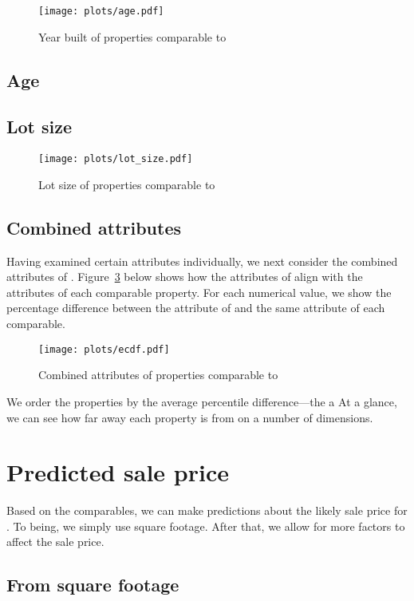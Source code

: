 \documentclass[
12pt, %
letterpaper, %
oneside, %
headinclude,footinclude, %
BCOR5mm, %
]{scrartcl}
\begin{document}
\begin{figure}
\centering
\caption{Year built of properties comparable to \PropertyName{}} \label{fig:age}  
\texttt{[image: plots/age.pdf]} 
\end{figure}
\subsection{Age}

\subsection{Lot size}

\begin{figure}
\centering
\caption{Lot size of properties comparable to \PropertyName{}} \label{fig:lot_size}  
\texttt{[image: plots/lot\_size.pdf]} 
\end{figure}


\subsection{Combined attributes}
Having examined certain attributes individually, we next consider the combined attributes of \PropertyName{}.
Figure~\ref{fig:ecdf} below shows how the attributes of \PropertyName{} align with the attributes of each comparable property.
For each numerical value, we show the percentage difference between the attribute of \PropertyName{} and the same attribute of each comparable.

\begin{figure}
\centering
\caption{Combined attributes of properties comparable to \PropertyName{}} \label{fig:ecdf}  
\texttt{[image: plots/ecdf.pdf]} 
\end{figure}

We order the properties by the average percentile difference---the a
At a glance, we can see how far away each property is from \PropertyName{} on a number of dimensions. 

\section{Predicted sale price}
Based on the comparables, we can make predictions about the likely sale price for \PropertyName{}. 
To being, we simply use square footage.
After that, we allow for more factors to affect the sale price.

\subsection{From square footage}
\end{document}
